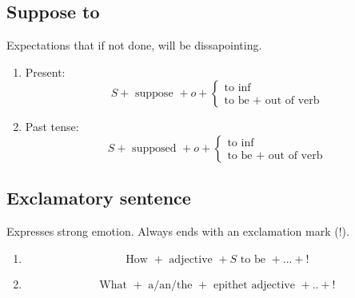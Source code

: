 \subsection{Suppose to}
\begin{definition}[Suppose to]
  Expectations that if not done, will be dissapointing.
\end{definition}
\begin{enumerate}
\item Present:
  $$
  S + \text{ suppose } + o +
  \begin{cases}
    \text{to inf} \\
    \text{to be } + \text{ out of verb}
  \end{cases}
  $$
\item Past tense:
  $$
  S + \text{ supposed } + o +
  \begin{cases}
    \text{to inf} \\
    \text{to be } + \text{ out of verb}
  \end{cases}
  $$
\end{enumerate}

\subsection{Exclamatory sentence}
\begin{definition}
  Expresses strong emotion. Always ends with an exclamation mark (!).
\end{definition}
\begin{enumerate}
\item
  $$\text{How } + \text{ adjective } + S \text{ to be } + ... + ! $$
\item
  $$\text{What } + \text{ a/an/the } + \text{ epithet adjective } + .. + ! $$
\end{enumerate}
